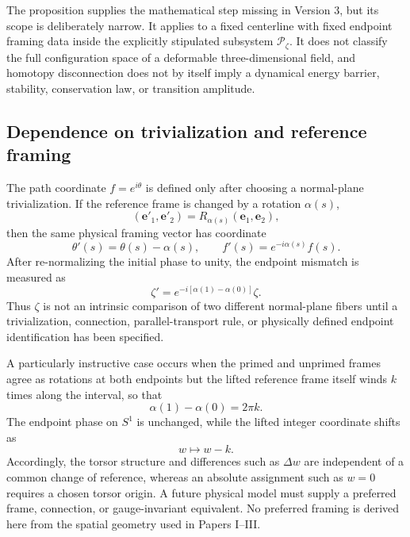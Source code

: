 \documentclass[aps,prd,reprint,superscriptaddress,nofootinbib,longbibliography,floatfix]{revtex4-2}
\begin{document}
The proposition supplies the mathematical step missing in Version 3, but its scope is deliberately narrow. It applies to a fixed centerline with fixed endpoint framing data inside the explicitly stipulated subsystem $\mathcal P_\zeta$. It does not classify the full configuration space of a deformable three-dimensional field, and homotopy disconnection does not by itself imply a dynamical energy barrier, stability, conservation law, or transition amplitude.

\subsection{Dependence on trivialization and reference framing}
\label{sec:trivialization}

The path coordinate $f=e^{i\theta}$ is defined only after choosing a normal-plane trivialization. If the reference frame is changed by a rotation $\alpha(s)$,
\begin{equation}
(\mathbf e'_1,\mathbf e'_2)=R_{\alpha(s)}(\mathbf e_1,\mathbf e_2),
\label{eq:framechange}
\end{equation}
then the same physical framing vector has coordinate
\begin{equation}
\theta'(s)=\theta(s)-\alpha(s),
\qquad
f'(s)=e^{-i\alpha(s)}f(s).
\label{eq:phasetransform}
\end{equation}
After re-normalizing the initial phase to unity, the endpoint mismatch is measured as
\begin{equation}
\zeta'
=e^{-i[\alpha(1)-\alpha(0)]}\zeta.
\label{eq:zetatransform}
\end{equation}
Thus $\zeta$ is not an intrinsic comparison of two different normal-plane fibers until a trivialization, connection, parallel-transport rule, or physically defined endpoint identification has been specified.

A particularly instructive case occurs when the primed and unprimed frames agree as rotations at both endpoints but the lifted reference frame itself winds $k$ times along the interval, so that
\begin{equation}
\alpha(1)-\alpha(0)=2\pi k.
\label{eq:alphawinding}
\end{equation}
The endpoint phase on $S^1$ is unchanged, while the lifted integer coordinate shifts as
\begin{equation}
w\longmapsto w-k.
\label{eq:wshift}
\end{equation}
Accordingly, the torsor structure and differences such as $\Delta w$ are independent of a common change of reference, whereas an absolute assignment such as $w=0$ requires a chosen torsor origin. A future physical model must supply a preferred frame, connection, or gauge-invariant equivalent. No preferred framing is derived here from the spatial geometry used in Papers I--III.
\end{document}
